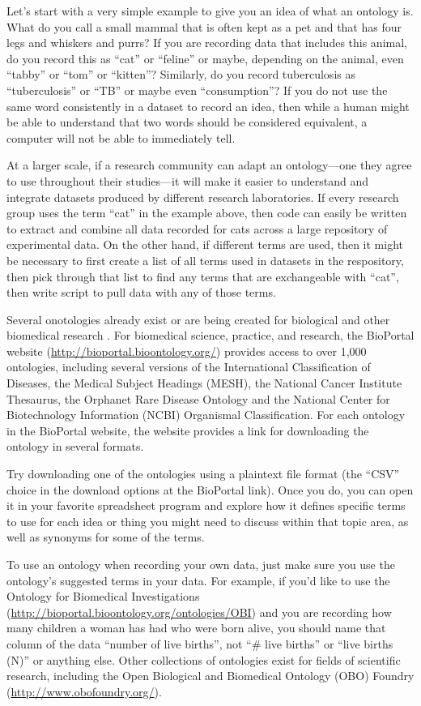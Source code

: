 \documentclass[]{tufte-book}
\begin{document}
Let's start with a very simple example to give you an idea of what an ontology
is. What do you call a small mammal that is often kept as a pet and that has
four legs and whiskers and purrs? If you are recording data that includes this
animal, do you record this as ``cat'' or ``feline'' or maybe, depending on the
animal, even ``tabby'' or ``tom'' or ``kitten''? Similarly, do you record tuberculosis
as ``tuberculosis'' or ``TB'' or maybe even ``consumption''? If you do not use the
same word consistently in a dataset to record an idea, then while a human might
be able to understand that two words should be considered equivalent, a computer
will not be able to immediately tell.

At a larger scale, if a research community can adapt an ontology---one they
agree to use throughout their studies---it will make it easier to understand and
integrate datasets produced by different research laboratories. If every
research group uses the term ``cat'' in the example above, then code can easily be
written to extract and combine all data recorded for cats across a large
repository of experimental data. On the other hand, if different terms are used,
then it might be necessary to first create a list of all terms used in datasets
in the respository, then pick through that list to find any terms that are
exchangeable with ``cat'', then write script to pull data with any of those terms.

Several onotologies already exist or are being created for biological and other
biomedical research \citep{ghosh2011software}. For biomedical science, practice, and
research, the BioPortal website (\url{http://bioportal.bioontology.org/}) provides
access to over 1,000 ontologies, including several versions of the International
Classification of Diseases, the Medical Subject Headings (MESH), the National
Cancer Institute Thesaurus, the Orphanet Rare Disease Ontology and the National
Center for Biotechnology Information (NCBI) Organismal Classification. For each
ontology in the BioPortal website, the website provides a link for downloading
the ontology in several formats.

Try downloading one of the ontologies using a plaintext file format (the ``CSV''
choice in the download options at the BioPortal link). Once you do, you can open
it in your favorite spreadsheet program and explore how it defines specific
terms to use for each idea or thing you might need to discuss within that topic
area, as well as synonyms for some of the terms.

To use an ontology when recording your own data, just make sure you use the
ontology's suggested terms in your data. For example, if you'd like to use the
Ontology for Biomedical Investigations
(\url{http://bioportal.bioontology.org/ontologies/OBI}) and you are recording how many
children a woman has had who were born alive, you should name that column of the
data ``number of live births'', not ``\# live births'' or ``live births (N)'' or
anything else. Other collections of ontologies exist for fields of scientific
research, including the Open Biological and Biomedical Ontology (OBO) Foundry
(\url{http://www.obofoundry.org/}).
\end{document}
